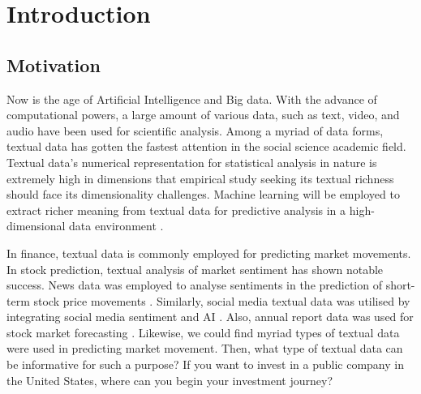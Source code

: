 \documentclass[logo,bsc,singlespacing,parskip]{infthesis}
\begin{document}
\chapter{Introduction}
\section{Motivation}


Now is the age of  Artificial Intelligence and Big data. With the advance of computational powers, a large amount of various data, such as text, video, and audio have been used for scientific analysis. Among a myriad of data forms, textual data has gotten the fastest attention in the social science academic field. Textual data’s numerical representation for statistical analysis in nature is extremely high in dimensions that empirical study seeking its textual richness should face its dimensionality challenges. Machine learning will be employed to extract richer meaning from textual data for predictive analysis in a high-dimensional data environment \cite{ke2020predicting}. 

In finance, textual data is commonly employed for predicting market movements\cite{ke2020predicting, Schumaker2009, Shah2018, Maqbool2023, Wang2023, GloddHristova2023}. In stock prediction,
textual analysis of market sentiment has shown notable success. 
News data was employed to analyse sentiments in the prediction of short-term stock price movements \cite{Shah2018}. Similarly, social media textual data was utilised by integrating social media sentiment and AI \cite{Wang2023}. Also, annual report data was used for stock market forecasting \cite{GloddHristova2023}. Likewise, we could find myriad types of textual data were used in predicting market movement. Then, what type of textual data can be informative for such a purpose? If you want to invest in a public company in the United States, where can you begin your investment journey?
\end{document}
